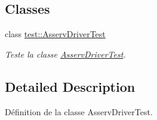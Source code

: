 \subsection*{Classes}
\begin{DoxyCompactItemize}
\item 
class \hyperlink{classtest_1_1AsservDriverTest}{test\+::\+Asserv\+Driver\+Test}
\begin{DoxyCompactList}\small\item\em Teste la classe \hyperlink{classtest_1_1AsservDriverTest}{Asserv\+Driver\+Test}. \end{DoxyCompactList}\end{DoxyCompactItemize}


\subsection{Detailed Description}
Définition de la classe Asserv\+Driver\+Test. 


